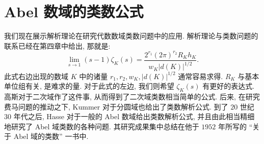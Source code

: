 \chapter{Abel 数域的类数公式}\label{ch:6}

我们现在展示解析理论在研究代数数域类数问题中的应用. 解析理论与类数问题的联系已经在第四章中给出, 那就是:
\[
  \lim_{s\to1}(s-1)\zeta_K(s)=\frac{2^{r_1}(2\pi)^{r_2}R_Kh_K}{w_K|d(K)|^{1/2}}.
\]
此式右边出现的数域 $K$ 中的诸量 $r_1,r_2,w_K,|d(K)|^{1/2}$ 通常容易求得. $R_K$ 与基本单位组有关, 是难求的量. 对于此式的左边, 我们则希望 $\zeta_K(s)$ 有更好的表达式. 高斯对于二次域作了这件事, 从而得到了二次域类数相当简单的公式. 后来, 在研究费马问题的推动之下, Kummer 对于分圆域也给出了类数解析公式. 到了 $20$ 世纪 $30$ 年代之后, Hasse 对于一般的 Abel 数域给出类数解析公式, 并且由此相当精细地研究了 Abel 域类数的各种问题. 其研究成果集中总结在他于 $1952$ 年所写的 ``关于 Abel 域的类数'' 一书中.




